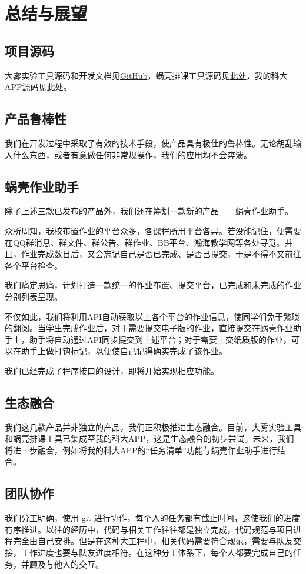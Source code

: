\section{总结与展望}
\subsection{项目源码}
大雾实验工具源码和开发文档见\href{https://github.com/feixukeji/PhyX}{GitHub}，蜗壳排课工具源码见\href{https://rec.ustc.edu.cn/share/58855c20-6911-11ee-946f-d117a7db9848}{此处}，我的科大APP源码见\href{https://rec.ustc.edu.cn/share/1e33e8c0-6911-11ee-bd5b-631c3fa07e2e}{此处}。

\subsection{产品鲁棒性}
我们在开发过程中采取了有效的技术手段，使产品具有极佳的鲁棒性。无论胡乱输入什么东西，或者有意做任何非常规操作，我们的应用均不会奔溃。

\subsection{蜗壳作业助手}
除了上述三款已发布的产品外，我们还在筹划一款新的产品——蜗壳作业助手。

众所周知，我校布置作业的平台众多，各课程所用平台各异。若没能记住，便需要在QQ群消息、群文件、群公告、群作业、BB平台、瀚海教学网等各处寻觅。并且，作业完成数日后，又会忘记自己是否已完成、是否已提交，于是不得不又前往各个平台检查。

我们痛定思痛，计划打造一款统一的作业布置、提交平台，已完成和未完成的作业分别列表呈现。

不仅如此，我们将利用API自动获取以上各个平台的作业信息，使同学们免于繁琐的翻阅。当学生完成作业后，对于需要提交电子版的作业，直接提交在蜗壳作业助手上，助手将自动通过API同步提交到上述平台；对于需要上交纸质版的作业，可以在助手上做打钩标记，以便使自己记得确实完成了该作业。

我们已经完成了程序接口的设计，即将开始实现相应功能。

\subsection{生态融合}
我们这几款产品并非独立的产品，我们正积极推进生态融合。目前，大雾实验工具和蜗壳排课工具已集成至我的科大APP，这是生态融合的初步尝试。未来，我们将进一步融合，例如将我的科大APP的“任务清单”功能与蜗壳作业助手进行结合。

\subsection{团队协作}
我们分工明确，使用 git 进行协作，每个人的任务都有截止时间，这使我们的进度有序推进。以往的经历中，代码与相关工作往往都是独立完成，代码规范与项目进程完全由自己安排。但是在这种大工程中，相关代码需要符合规范，需要与队友交接，工作进度也要与队友进度相符。在这种分工体系下，每个人都要完成自己的任务，并顾及与他人的交互。

